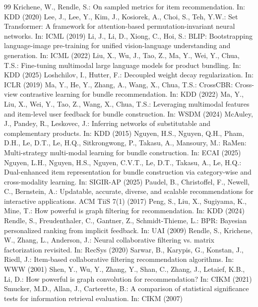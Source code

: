 \documentclass[runningheads]{llncs}
\begin{document}
\begin{thebibliography}{99}
 Krichene, W., Rendle, S.: On sampled metrics for item recommendation. In: KDD (2020)
 Lee, J., Lee, Y., Kim, J., Kosiorek, A., Choi, S., Teh, Y.W.: Set Transformer: A framework for attention-based permutation-invariant neural networks. In: ICML (2019)
 Li, J., Li, D., Xiong, C., Hoi, S.: BLIP: Bootstrapping language-image pre-training for unified vision-language understanding and generation. In: ICML (2022)
 Liu, X., Wu, J., Tao, Z., Ma, Y., Wei, Y., Chua, T.S.: Fine-tuning multimodal large language models for product bundling. In: KDD (2025)
 Loshchilov, I., Hutter, F.: Decoupled weight decay regularization. In: ICLR (2019)
 Ma, Y., He, Y., Zhang, A., Wang, X., Chua, T.S.: CrossCBR: Cross-view contrastive learning for bundle recommendation. In: KDD (2022)
 Ma, Y., Liu, X., Wei, Y., Tao, Z., Wang, X., Chua, T.S.: Leveraging multimodal features and item-level user feedback for bundle construction. In: WSDM (2024)
 McAuley, J., Pandey, R., Leskovec, J.: Inferring networks of substitutable and complementary products. In: KDD (2015)
 Nguyen, H.S., Nguyen, Q.H., Pham, D.H., Le, D.T., Le, H.Q., Sitkrongwong, P., Takasu, A., Mansoury, M.: RaMen: Multi-strategy multi-modal learning for bundle construction. In: ECAI (2025)
 Nguyen, L.H., Nguyen, H.S., Nguyen, C.V.T., Le, D.T., Takasu, A., Le, H.Q.: Dual-enhanced item representation for bundle construction via category-wise and cross-modality learning. In: SIGIR-AP (2025)
 Paudel, B., Christoffel, F., Newell, C., Bernstein, A.: Updatable, accurate, diverse, and scalable recommendations for interactive applications. ACM TiiS 7(1) (2017)
 Peng, S., Liu, X., Sugiyama, K., Mine, T.: How powerful is graph filtering for recommendation. In: KDD (2024)
 Rendle, S., Freudenthaler, C., Gantner, Z., Schmidt-Thieme, L.: BPR: Bayesian personalized ranking from implicit feedback. In: UAI (2009)
 Rendle, S., Krichene, W., Zhang, L., Anderson, J.: Neural collaborative filtering vs. matrix factorization revisited. In: RecSys (2020)
 Sarwar, B., Karypis, G., Konstan, J., Riedl, J.: Item-based collaborative filtering recommendation algorithms. In: WWW (2001)
 Shen, Y., Wu, Y., Zhang, Y., Shan, C., Zhang, J., Letaief, K.B., Li, D.: How powerful is graph convolution for recommendation? In: CIKM (2021)
 Smucker, M.D., Allan, J., Carterette, B.: A comparison of statistical significance tests for information retrieval evaluation. In: CIKM (2007)

\end{thebibliography}
\end{document}

